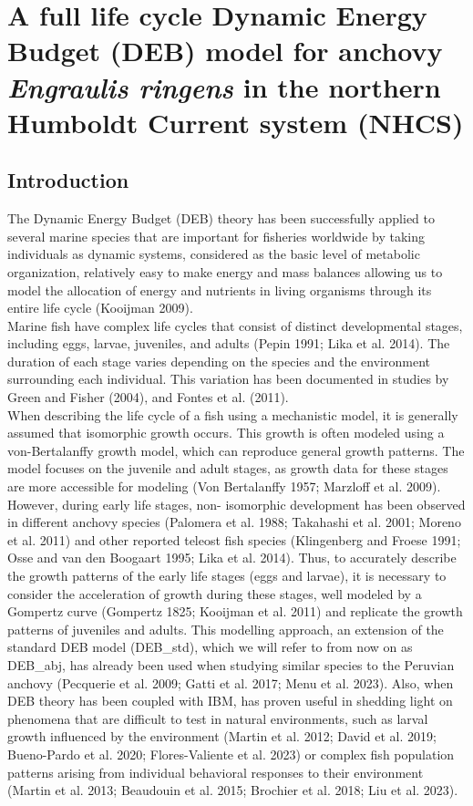 \chapter{A full life cycle Dynamic Energy Budget (DEB) model for anchovy \textit{Engraulis ringens} in the northern Humboldt Current system (NHCS)}\label{Chap4}

\clearpage
\section{Introduction}

The Dynamic Energy Budget (DEB) theory has been successfully applied to several marine species that are important for fisheries worldwide by taking individuals as dynamic systems, considered as the basic level of metabolic organization, relatively easy to make energy and mass balances allowing us to model the allocation of energy and nutrients in living organisms through its entire life cycle (Kooijman 2009).\\

Marine fish have complex life cycles that consist of distinct developmental stages, including eggs, larvae, juveniles, and adults (Pepin 1991; Lika et al. 2014). The duration of each stage varies depending on the species and the environment surrounding each individual. This variation has been documented in studies by Green and Fisher (2004), and Fontes et al. (2011).\\

When describing the life cycle of a fish using a mechanistic model, it is generally assumed that isomorphic growth occurs. This growth is often modeled using a von-Bertalanffy growth model, which can reproduce general growth patterns. The model focuses on the juvenile and adult stages, as growth data for these stages are more accessible for modeling (Von Bertalanffy 1957; Marzloff et al. 2009). However, during early life stages, non- isomorphic development has been observed in different anchovy species (Palomera et al. 1988; Takahashi et al. 2001; Moreno et al. 2011) and other reported teleost fish species (Klingenberg and Froese 1991; Osse and van den Boogaart 1995; Lika et al. 2014). Thus, to accurately describe the growth patterns of the early life stages (eggs and larvae), it is necessary to consider the acceleration of growth during these stages, well modeled by a Gompertz curve (Gompertz 1825; Kooijman et al. 2011) and replicate the growth patterns of juveniles and adults. This modelling approach, an extension of the standard DEB model (DEB_std), which we will refer to from now on as DEB_abj, has already been used when studying similar species to the Peruvian anchovy (Pecquerie et al. 2009; Gatti et al. 2017; Menu et al. 2023). Also, when DEB theory has been coupled with IBM, has proven useful in shedding light on phenomena that are difficult to test in natural environments, such as larval growth influenced by the environment (Martin et al. 2012; David et al. 2019; Bueno-Pardo et al. 2020; Flores-Valiente et al. 2023) or complex fish population patterns arising from individual behavioral responses to their environment (Martin et al. 2013; Beaudouin et al. 2015; Brochier et al. 2018; Liu et al. 2023).\\

